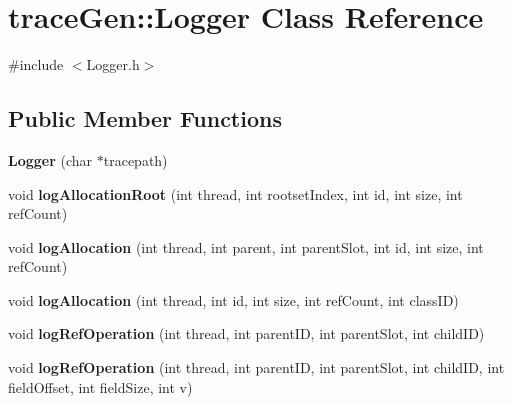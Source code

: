 \hypertarget{classtrace_gen_1_1_logger}{}\section{trace\+Gen\+:\+:Logger Class Reference}
\label{classtrace_gen_1_1_logger}


{\ttfamily \#include $<$Logger.\+h$>$}

\subsection*{Public Member Functions}
\begin{DoxyCompactItemize}
\item 
\hypertarget{classtrace_gen_1_1_logger_a8b8e229fdb7b769ce9b6324b5c684b74}{}{\bfseries Logger} (char $\ast$tracepath)\label{classtrace_gen_1_1_logger_a8b8e229fdb7b769ce9b6324b5c684b74}

\item 
\hypertarget{classtrace_gen_1_1_logger_a15960686c4550d72c2ca359d1e168d36}{}void {\bfseries log\+Allocation\+Root} (int thread, int rootset\+Index, int id, int size, int ref\+Count)\label{classtrace_gen_1_1_logger_a15960686c4550d72c2ca359d1e168d36}

\item 
\hypertarget{classtrace_gen_1_1_logger_acf606cb770be89fd5583936c43e5261b}{}void {\bfseries log\+Allocation} (int thread, int parent, int parent\+Slot, int id, int size, int ref\+Count)\label{classtrace_gen_1_1_logger_acf606cb770be89fd5583936c43e5261b}

\item 
\hypertarget{classtrace_gen_1_1_logger_a4d12048cd3295c64703ae0fa2b63f0c9}{}void {\bfseries log\+Allocation} (int thread, int id, int size, int ref\+Count, int class\+I\+D)\label{classtrace_gen_1_1_logger_a4d12048cd3295c64703ae0fa2b63f0c9}

\item 
\hypertarget{classtrace_gen_1_1_logger_a1bb8b536f620bfa803ab247e0c1145f8}{}void {\bfseries log\+Ref\+Operation} (int thread, int parent\+I\+D, int parent\+Slot, int child\+I\+D)\label{classtrace_gen_1_1_logger_a1bb8b536f620bfa803ab247e0c1145f8}

\item 
\hypertarget{classtrace_gen_1_1_logger_a214f156a91f50f3ba6e514816af1f3a8}{}void {\bfseries log\+Ref\+Operation} (int thread, int parent\+I\+D, int parent\+Slot, int child\+I\+D, int field\+Offset, int field\+Size, int v)\label{classtrace_gen_1_1_logger_a214f156a91f50f3ba6e514816af1f3a8}


\end{DoxyCompactItemize}

